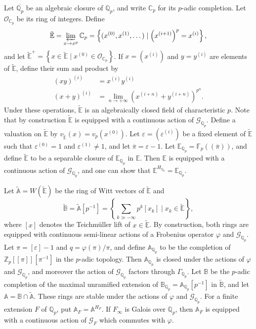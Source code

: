 \documentclass{amsart}
\newcommand{\QQ}{\mathbb Q}
\newcommand{\FF}{\mathbb F}
\newcommand{\ZZ}{\mathbb Z}
\newcommand{\EE}{\mathbb E}
\newcommand{\BB}{\mathbb B}
\renewcommand{\AA}{\mathbb A}
\newcommand{\calG}{\mathcal{G}}
\newcommand{\calO}{\mathcal{O}}
\newcommand{\CC}{\mathbb{C}}
\newcommand{\vp}{\varphi}
\begin{document}
   Let $\overline{\QQ_p}$ be an algebraic closure of $\QQ_p$, and write $\CC_p$ for its $p$-adic completion. Let $\calO_{\CC_p}$ be its ring of integers. Define
   \[ \tilde{\EE}=\varprojlim_{x\rightarrow x^p} \CC_p = \left\{ (x^{(0)},x^{(1)},\dots)\mid \left(x^{(i+1)}\right)^p=x^{(i)}\right\},\]
   and let $\tilde{\EE}^+=\left\{x\in\tilde{\EE}\mid x^{(0)}\in \calO_{\CC_p}\right\}$. If $x=(x^{(i)})$ and $y=y^{(i)}$ are elements of $\tilde{\EE}$, define their sum and product by
   \begin{align*}
    (xy)^{(i)} &= x^{(i)}y^{(i)}\\
    (x+y)^{(i)} &= \lim_{n\rightarrow+\infty}\left(x^{(i+n)}+y^{(i+n)}\right)^{p^n}.
   \end{align*}
   Under these operations, $\tilde{\EE}$ is an algebraically closed field of characteristic $p$. Note that by construction $\tilde{\EE}$ is equipped with a continuous action of $\calG_{\QQ_p}$. Define a valuation on $\tilde{\EE}$ by $v_{\tilde{\EE}}(x)=v_p(x^{(0)})$. Let $\varepsilon=(\varepsilon^{(i)})$ be a fixed element of $\tilde{\EE}$ such that $\varepsilon^{(0)}=1$ and $\varepsilon^{(1)}\neq 1$, and let $\overline{\pi}=\varepsilon-1$. Let $\EE_{\QQ_p}=\FF_p((\overline{\pi}))$, and define $\tilde{\EE}$ to be a separable closure of $\EE_{\QQ_p}$ in $\EE$. Then $\EE$ is equipped with a continuous action of $\calG_{\QQ_p}$, and one can show that $\EE^{H_{\QQ_p}}=\EE_{\QQ_p}$.
  
   Let $\tilde{\AA}=W(\tilde{\EE})$ be the ring of Witt vectors of $\tilde{\EE}$ and
   \[ \tilde{\BB}=\tilde{\AA}[p^{-1}]=\left\{\sum_{k\gg -\infty}p^k[x_k]\mid x_k\in\tilde{\EE}\right\},\]
   where $[x]$ denotes the Teichm\"uller lift of $x\in\tilde{\EE}$. By construction, both rings are equipped with continuous semi-linear actions of a Frobenius operator $\varphi$ and $\calG_{\QQ_p}$. Let $\pi=[\varepsilon]-1$ and $q=\vp(\pi)\slash\pi$, and define $\AA_{\QQ_p}$ to be the completion of $\ZZ_p[[\pi]][\pi^{-1}]$ in the $p$-adic topology. Then $\AA_{\QQ_p}$ is closed under the actions of $\vp$ and $\calG_{\QQ_p}$, and moreover the action of $\calG_{\QQ_p}$ factors through $\Gamma_{\QQ_p}$. Let $\BB$ be the $p$-adic completion of the maximal unramified extension of $\BB_{\QQ_p}=\AA_{\QQ_p}[p^{-1}]$ in $\tilde{\BB}$, and let $\AA=\BB\cap \tilde{\AA}$. These rings are stable under the actions of $\vp$ and $\calG_{\QQ_p}$. For a finite extension $F$ of $\QQ_p$, put $\AA_F=\AA^{H_F}$. If $F_\infty$ is Galois over $\QQ_p$, then $\AA_F$ is equipped with a continuous action of $\calG_F$ which commutes with $\vp$. 
 
\end{document}
